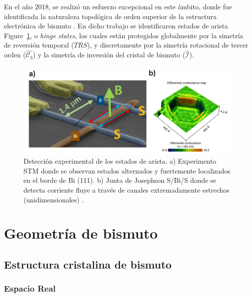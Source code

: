 \documentclass[
  letterpaper,
  DIV=11,
  numbers=noendperiod]{scrreprt}
\begin{document}
En el año 2018, se realizó un esfuerzo excepcional en este ámbito, donde
fue identificada la naturaleza topológica de orden superior de la
estructura electrónica de bismuto \cite{Schindler2018}. En dicho trabajo
se identificaron estados de arista Figure~\ref{fig-expBihs}, o
\textit{hinge states}, los cuales están protegidos globalmente por la
simetría de reversión temporal (\(TRS\)), y discretamente por la
simetría rotacional de tercer orden (\(\hat{\mathcal{C}_3}\)) y la
simetría de inversión del cristal de bismuto (\(\hat{\mathcal{I}}\)).

\begin{figure}

{\centering \includegraphics{./images/Exp-bitop.png}

}

\caption{\label{fig-expBihs}Detección experimental de los estados de
arista. a) Experimento STM donde se observan estados alternados y
fuertemente localizados en el borde de Bi (111). b) Junta de Josephson
S/Bi/S donde se detecta corriente fluye a través de canales
extremadamente estrechos (unidimensionales) \cite{Schindler2018}.}

\end{figure}


\hypertarget{geometruxeda-de-bismuto}{%
\chapter{Geometría de bismuto}\label{geometruxeda-de-bismuto}}

\hypertarget{estructura-cristalina-de-bismuto}{%
\section{Estructura cristalina de
bismuto}\label{estructura-cristalina-de-bismuto}}

\hypertarget{espacio-real}{%
\subsection{Espacio Real}\label{espacio-real}}
\end{document}
